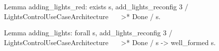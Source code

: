 Lemma adding_lights_red:
 exists s, 
  add_lights_reconfig 3 / LightsControlUseCaseArchitecture ~~~>* Done / s.

Lemma adding_lights:
 forall s,  
  add_lights_reconfig 3 / LightsControlUseCaseArchitecture ~~~>* Done / s ->
  well_formed s.